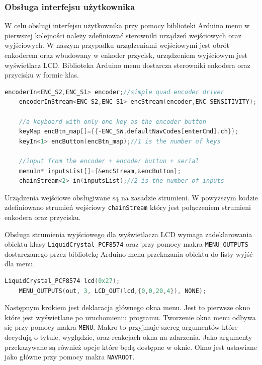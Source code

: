 \documentclass[../main.tex]{subfiles}
\begin{document}
\subsubsection{Obsługa interfejsu użytkownika}

W celu obsługi interfejsu użytkownika przy pomocy biblioteki Arduino menu w pierwszej kolejności należy zdefiniować sterowniki urządzeń
wejściowych oraz wyjściowych. W naszym przypadku urządzeniami wejściowymi jest obrót enkoderem oraz wbudowany w enkoder przycisk, urządzeniem wyjściowym
jest wyświetlacz LCD. Biblioteka Arduino menu dostarcza sterowniki enkodera oraz przycisku w formie klas.

\begin{lstlisting}[language=C++]
    encoderIn<ENC_S2,ENC_S1> encoder;//simple quad encoder driver
    encoderInStream<ENC_S2,ENC_S1> encStream(encoder,ENC_SENSITIVITY);

    //a keyboard with only one key as the encoder button
    keyMap encBtn_map[]={{-ENC_SW,defaultNavCodes[enterCmd].ch}};
    keyIn<1> encButton(encBtn_map);//1 is the number of keys

    //input from the encoder + encoder button + serial
    menuIn* inputsList[]={&encStream,&encButton};
    chainStream<2> in(inputsList);//2 is the number of inputs
\end{lstlisting}

Urządzenia wejściowe obsługiwane są na zasadzie strumieni. W powyższym kodzie zdefiniowano strumień wejściowy \texttt{chainStream} który
jest połączeniem strumieni enkodera oraz przycisku.
\par
Obsługa strumienia wyjściowego dla wyświetlacza LCD wymaga zadeklarowania obiektu klasy \texttt{LiquidCrystal\_PCF8574} oraz przy
pomocy makra \texttt{MENU\_OUTPUTS} dostarczanego przez bibliotekę Arduino menu przekazania obiektu do listy wyjść dla menu.

\begin{lstlisting}[language=C++]
    LiquidCrystal_PCF8574 lcd(0x27);
    MENU_OUTPUTS(out, 3, LCD_OUT(lcd,{0,0,20,4}), NONE);
\end{lstlisting}

\par
Następnym krokiem jest deklaracja głównego okna menu. Jest to pierwsze okno które jest wyświetlane po uruchomieniu programu.
Tworzenie okna menu odbywa się przy pomocy makra \texttt{MENU}. Makro to przyjmuje szereg argumentów które decydują o 
tytule, wyglądzie, oraz reakcjach okna na zdarzenia. Jako argumenty przekazywane są również opcje które będą dostępne w oknie.
Okno jest ustawiane jako główne przy pomocy makra \texttt{NAVROOT}.
\end{document}
